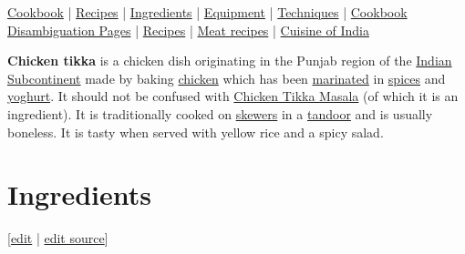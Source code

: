 \documentclass[11pt,a4paper]{article}
\begin{document}
\href{https://en.wikibooks.org/wiki/Cookbook:Table\_of\_Contents}{Cookbook} | \href{https://en.wikibooks.org/wiki/Cookbook:Recipes}{Recipes} | \href{https://en.wikibooks.org/wiki/Cookbook:Ingredients}{Ingredients} | \href{https://en.wikibooks.org/wiki/Cookbook:Equipment}{Equipment} | \href{https://en.wikibooks.org/wiki/Cookbook:Cooking\_Techniques}{Techniques} | \href{https://en.wikibooks.org/wiki/Category:Cookbook\_disambiguation\_pages}{Cookbook Disambiguation Pages} | \href{https://en.wikibooks.org/wiki/Category:Recipes}{Recipes} | \href{https://en.wikibooks.org/wiki/Cookbook:Meat\_Recipes}{Meat recipes} | \href{https://en.wikibooks.org/wiki/Cookbook:Cuisine\_of\_India}{Cuisine of India}

\textbf{Chicken tikka} is a chicken dish originating in the Punjab region of the \href{https://en.wikibooks.org/wiki/Cookbook:Cuisine\_of\_India}{Indian Subcontinent} made by baking \href{https://en.wikibooks.org/wiki/Cookbook:Chicken}{chicken} which has been \href{https://en.wikibooks.org/wiki/Cookbook:Marinating}{marinated} in \href{https://en.wikibooks.org/wiki/Cookbook:Spices\_and\_herbs}{spices} and \href{https://en.wikibooks.org/wiki/Cookbook:Yogurt}{yoghurt}. It should not be confused with \href{https://en.wikibooks.org/wiki/Cookbook:Chicken\_Tikka\_Masala}{Chicken Tikka Masala} (of which it is an ingredient). It is traditionally cooked on \href{https://en.wikibooks.org/wiki/Cookbook:Skewer}{skewers} in a \href{https://en.wikibooks.org/wiki/Cookbook:Tandoor}{tandoor} and is usually boneless. It is tasty when served with yellow rice and a spicy salad.

\section{Ingredients}

[\href{https://en.wikibooks.org/w/index.php?title=Cookbook:Chicken\_Tikka\&veaction=edit\&section=1}{edit} | \href{https://en.wikibooks.org/w/index.php?title=Cookbook:Chicken\_Tikka\&action=edit\&section=1}{edit source}]
\end{document}
